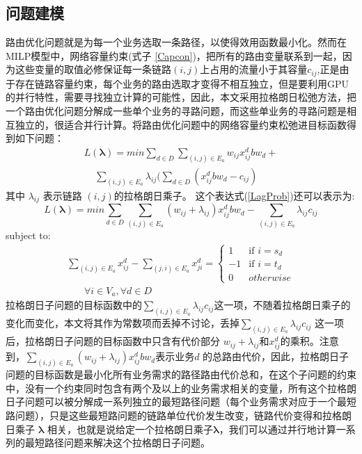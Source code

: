\subsection{问题建模}
路由优化问题就是为每一个业务选取一条路径，以使得效用函数最小化。然而在MILP模型中，网络容量约束(式子 \ref{Capcon})，把所有的路由变量联系到一起，因为这些变量的取值必修保证每一条链路$(i,j)$上占用的流量小于其容量$c_{ij}$,正是由于存在链路容量约束，每个业务的路由选取才变得不相互独立，但是要利用GPU 的并行特性，需要寻找独立计算的可能性，因此，本文采用拉格朗日松弛方法，把一个路由优化问题分解成一些单个业务的寻路问题，而这些单业务的寻路问题是相互独立的，很适合并行计算。将路由优化问题中的网络容量约束松弛进目标函数得到如下问题：
\begin{equation}\label{LagProb}
\begin{split}
L(\mathbf{\lambda})= min\sum\limits_{d \in D}\sum\limits_{(i,j) \in E_a} w_{ij}x_{ij}^d bw_d+ \\ ~~~~~\sum\limits_{(i,j) \in E_a}\lambda_{ij}(\sum\limits_{d \in D} (x_{ij}^d bw_d-c_{ij})
\end{split}
\end{equation}
其中 $\lambda_{ij}$ 表示链路 $(i,j)$的拉格朗日乘子。
这个表达式(\ref{LagProb})还可以表示为:
\begin{equation}\label{Lagprob1}
L(\mathbf{\lambda})= min\sum\limits_{d \in D}\sum\limits_{(i,j) \in E_a} (w_{ij}+\lambda_{ij})x_{ij}^dbw_d -\sum\limits_{(i,j) \in E_a}\lambda_{ij}c_{ij}
\end{equation}
subject to:
\begin{equation}\label{FlowConv2}
\begin{split}
\sum\limits_{(i,j) \in E_a} x_{ij}^d - \sum\limits_{(j,i) \in E_a} x_{ji}^d
=\begin{cases}
1 & \text{if $i = s_d$}\\
-1 & \text{if $i = t_d$} \\
0 &{otherwise}
\end{cases}
\\~~~~~~~~\forall i\in V_a, \forall d\in D
\end{split}
\end{equation}
拉格朗日子问题的目标函数中的$\sum_{(i,j) \in E_a}\lambda_{ij}c_{ij}$这一项，不随着拉格朗日乘子的变化而变化，本文将其作为常数项而丢掉不讨论，丢掉$\sum_{(i,j) \in E_a}\lambda_{ij}c_{ij}$ 这一项后，拉格朗日子问题的目标函数中只含有代价部分 $w_{ij}+\lambda_{ij}$和$x_{ij}^d$的乘积。注意到，$\sum_{(i,j) \in E_a} (w_{ij}+\lambda_{ij})x_{ij}^d bw_d$表示业务$d$ 的总路由代价，因此，拉格朗日子问题的目标函数是最小化所有业务需求的路径路由代价总和，在这个子问题的约束中，没有一个约束同时包含有两个及以上的业务需求相关的变量，所有这个拉格朗日子问题可以被分解成一系列独立的最短路径问题（每个业务需求对应于一个最短路问题），只是这些最短路问题的链路单位代价发生改变，链路代价变得和拉格朗日乘子 $\mathbf{\lambda}$ 相关，也就是说给定一个拉格朗日乘子$\mathbf{\lambda}$，我们可以通过并行地计算一系列的最短路径问题来解决这个拉格朗日子问题。
